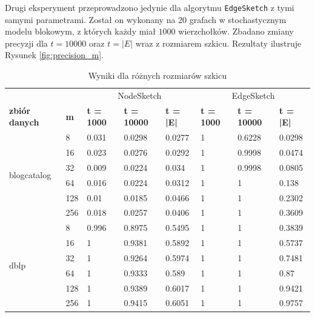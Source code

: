     Drugi eksperyment przeprowadzono jedynie dla algorytmu \texttt{EdgeSketch} z tymi samymi parametrami. Został on wykonany na $20$ grafach w stochastycznym modelu blokowym, z których każdy miał $1000$ wierzchołków. Zbadano zmiany precyzji dla $t = 10000$ oraz $t = |E|$ wraz z rozmiarem szkicu. Rezultaty ilustruje Rysunek  \ref{fig:precision_m}.
    \begin{table}[!ht]
        \small
        \centering
        \begin{tabular}{|l|l|l|l|l|l|l|l|}
        \hline
        & & \multicolumn{3}{c|}{NodeSketch} & \multicolumn{3}{c|}{EdgeSketch} \\ \cline{1-8}
                \textbf{zbiór danych} & \textbf{m} & \textbf{t = 1000} & \textbf{t = 10000} & \textbf{t = |E|} & \textbf{t = 1000} & \textbf{t = 10000} & \textbf{t = |E|} \\ \hline\hline
        \multirow{6}{*}{blogcatalog} & 8 & 0.031 & 0.0298 & 0.0277 & 1 & 0.6228 & 0.0298 \\ \cline{2-8}
            & 16 & 0.023 & 0.0276 & 0.0292 & 1 & 0.9998 & 0.0474 \\ \cline{2-8}
            & 32 & 0.009 & 0.0224 & 0.034 & 1 & 0.9998 & 0.0805 \\ \cline{2-8}
            & 64 & 0.016 & 0.0224 & 0.0312 & 1 & 1 & 0.138 \\ \cline{2-8}
            & 128 & 0.01 & 0.0185 & 0.0466 & 1 & 1 & 0.2302 \\ \cline{2-8}
            & 256 & 0.018 & 0.0257 & 0.0406 & 1 & 1 & 0.3609 \\ \hline\hline
        \multirow{6}{*}{dblp} & 8 & 0.996 & 0.8975 & 0.5495 & 1 & 1 & 0.3839 \\ \cline{2-8}
            & 16 & 1 & 0.9381 & 0.5892 & 1 & 1 & 0.5737 \\ \cline{2-8}
            & 32 & 1 & 0.9264 & 0.5974 & 1 & 1 & 0.7481 \\ \cline{2-8}
            & 64 & 1 & 0.9333 & 0.589 & 1 & 1 & 0.87 \\ \cline{2-8}
            & 128 & 1 & 0.9389 & 0.6017 & 1 & 1 & 0.9421 \\ \cline{2-8}
            & 256 & 1 & 0.9415 & 0.6051 & 1 & 1 & 0.9757 \\ \hline
        \end{tabular}
        \caption{Wyniki dla różnych rozmiarów szkicu}
        \label{tab:sketch_size}
    \end{table}

